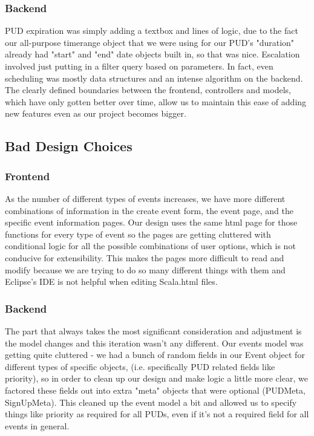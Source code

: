 \documentclass{article}
\begin{document}
\subsubsection{Backend}
PUD expiration was simply adding a textbox and lines of logic, due to the fact our all-purpose timerange object that we were using for our PUD's "duration" already had "start" and "end" date objects built in, so that was nice. Escalation involved just putting in a filter query based on parameters. In fact, even scheduling was mostly data structures and an intense algorithm on the backend. The clearly defined boundaries between the frontend, controllers and models, which have only gotten better over time, allow us to maintain this ease of adding new features even as our project becomes bigger.

\subsection{Bad Design Choices}
\subsubsection{Frontend}
As the number of different types of events increases, we have more different combinations of information in the create event form, the event page, and the specific event information pages. Our design uses the same html page for those functions for every type of event so the pages are getting cluttered with conditional logic for all the possible combinations of user options, which is not conducive for extensibility. This makes the pages more difficult to read and modify because we are trying to do so many different things with them and Eclipse's IDE is not helpful when editing Scala.html files. 

\subsubsection{Backend}
The part that always takes the most significant consideration and adjustment is the model changes and this iteration wasn't any different. Our events model was getting quite cluttered - we had a bunch of random fields in our Event object for different types of specific objects, (i.e. specifically PUD related fields like priority), so in order to clean up our design and make logic a little more clear, we factored these fields out into extra "meta" objects that were optional (PUDMeta, SignUpMeta). This cleaned up the event model a bit and allowed us to specify things like priority as required for all PUDs, even if it's not a required field for all events in general.
\end{document}
